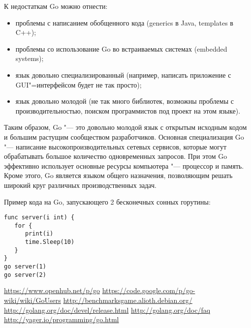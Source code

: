 \documentclass[10pt, a5paper]{article}
\begin{document}
К недостаткам Go можно отнести:

\begin{itemize}
  \item проблемы с написанием обобщенного кода (generics в Java, \linebreak templates в C++);
  \item проблемы со использование Go во встраиваемых системах \linebreak (embedded systems);
  \item язык довольно специализированный (например, написать приложение с GUI"=интерфейсом будет не так просто);
  \item язык довольно молодой (не так много библиотек, возможны проблемы с производительностью, поиском программистов под проект на этом языке).
\end{itemize}

Таким образом, Go "--- это довольно молодой язык с открытым исходным кодом и большим растущим сообществом разработчиков. Основная специализация Go "--- написание высокопроизводительных сетевых сервисов, которые могут обрабатывать большое количество одновременных запросов. При этом Go эффективно использует основные ресурсы компьютера "--- процессор и память. Кроме этого, Go является языком общего назначения, позволяющим решать широкий круг различных производственных задач.

Пример кода на Go, запускающего 2 бесконечных сонных горутины:

\begin{verbatim}
func server(i int) {
   for {
      print(i)
      time.Sleep(10)
   }
}
go server(1)
go server(2)
\end{verbatim}

\begin{thebibliography}{9}
 \url{https://www.openhub.net/p/go}
 \url{https://code.google.com/p/go-wiki/wiki/GoUsers}
 \url{http://benchmarksgame.alioth.debian.org/}
 \url{http://golang.org/doc/devel/release.html}
 \url{http://golang.org/doc/faq}
 \url{http://yager.io/programming/go.html}
\end{thebibliography}
\end{document}
